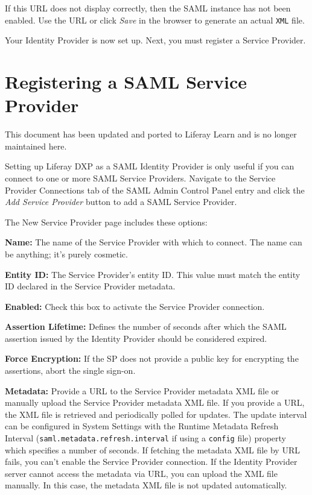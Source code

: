 If this URL does not display correctly, then the SAML instance has not
been enabled. Use the URL or click \emph{Save} in the browser to
generate an actual \texttt{XML} file.

Your Identity Provider is now set up. Next, you must register a Service
Provider.

\chapter{Registering a SAML Service
Provider}\label{registering-a-saml-service-provider}

{This document has been updated and ported to Liferay Learn and is no
longer maintained here.}

Setting up Liferay DXP as a SAML Identity Provider is only useful if you
can connect to one or more SAML Service Providers. Navigate to the
Service Provider Connections tab of the SAML Admin Control Panel entry
and click the \emph{Add Service Provider} button to add a SAML Service
Provider.

The New Service Provider page includes these options:

\textbf{Name:} The name of the Service Provider with which to connect.
The name can be anything; it's purely cosmetic.

\textbf{Entity ID:} The Service Provider's entity ID. This value must
match the entity ID declared in the Service Provider metadata.

\textbf{Enabled:} Check this box to activate the Service Provider
connection.

\textbf{Assertion Lifetime:} Defines the number of seconds after which
the SAML assertion issued by the Identity Provider should be considered
expired.

\textbf{Force Encryption:} If the SP does not provide a public key for
encrypting the assertions, abort the single sign-on.

\textbf{Metadata:} Provide a URL to the Service Provider metadata XML
file or manually upload the Service Provider metadata XML file. If you
provide a URL, the XML file is retrieved and periodically polled for
updates. The update interval can be configured in System Settings with
the Runtime Metadata Refresh Interval
(\texttt{saml.metadata.refresh.interval} if using a \texttt{config}
file) property which specifies a number of seconds. If fetching the
metadata XML file by URL fails, you can't enable the Service Provider
connection. If the Identity Provider server cannot access the metadata
via URL, you can upload the XML file manually. In this case, the
metadata XML file is not updated automatically.

